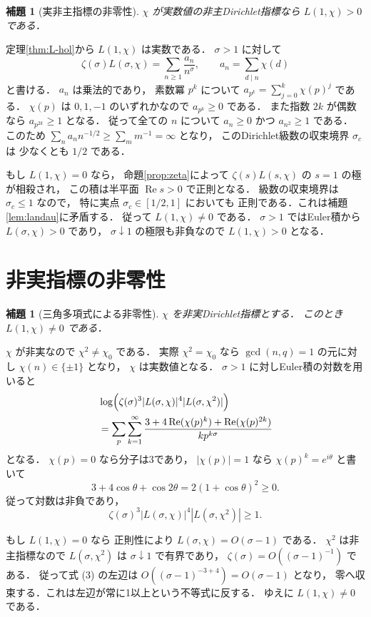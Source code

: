 \documentclass[a5paper,10pt,onecolumn]{jsarticle}
\makeatletter
\theoremstyle{mathnotetheorem}
\newtheorem{lemma}[theorem]{補題}
\renewcommand{\proofname}{証明}
\renewenvironment{proof}[1][\proofname]{%
  \par\pushQED{\qed}\normalfont\topsep4\p@\@plus2\p@\relax
  \trivlist\item[\hskip\labelsep\bfseries #1]\ignorespaces
}{\popQED\endtrivlist\@endpefalse}
\makeatother
\begin{document}
\begin{lemma}[実非主指標の非零性]\label{lem:real-nonzero}
$\chi$ が実数値の非主Dirichlet指標なら
$L(1,\chi)>0$ である．
\end{lemma}
\begin{proof}
定理\ref{thm:L-hol}から $L(1,\chi)$ は実数である．
$\sigma>1$ に対して
\[
 \zeta(\sigma)L(\sigma,\chi)
 =\sum_{n\ge1}\frac{a_n}{n^\sigma},
 \qquad
 a_n=\sum_{d\mid n}\chi(d)
\]
と書ける．
$a_n$ は乗法的であり，
素数冪 $p^k$ について
$a_{p^k}=\sum_{j=0}^k\chi(p)^j$ である．
$\chi(p)$ は $0,1,-1$ のいずれかなので
$a_{p^k}\ge0$ である．
また指数 $2k$ が偶数なら
$a_{p^{2k}}\ge1$ となる．
従って全ての $n$ について $a_n\ge0$ かつ
$a_{n^2}\ge1$ である．
このため
$\sum_n a_nn^{-1/2}\ge\sum_m m^{-1}=\infty$ となり，
このDirichlet級数の収束境界 $\sigma_c$ は
少なくとも $1/2$ である．

もし $L(1,\chi)=0$ なら，
命題\ref{prop:zeta}によって
$\zeta(s)L(s,\chi)$ の $s=1$ の極が相殺され，
この積は半平面 $\operatorname{Re}s>0$ で正則となる．
級数の収束境界は $\sigma_c\le1$ なので，
特に実点 $\sigma_c\in[1/2,1]$ においても
正則である．これは補題\ref{lem:landau}に矛盾する．
従って $L(1,\chi)\ne0$ である．
$\sigma>1$ ではEuler積から
$L(\sigma,\chi)>0$ であり，
$\sigma\downarrow1$ の極限も非負なので
$L(1,\chi)>0$ となる．
\end{proof}

\section{非実指標の非零性}

\begin{lemma}[三角多項式による非零性]\label{lem:complex-nonzero}
$\chi$ を非実Dirichlet指標とする．
このとき $L(1,\chi)\ne0$ である．
\end{lemma}
\begin{proof}
$\chi$ が非実なので $\chi^2\ne\chi_0$ である．
実際 $\chi^2=\chi_0$ なら
$\gcd(n,q)=1$ の元に対し $\chi(n)\in\{\pm1\}$ となり，
$\chi$ は実数値となる．
$\sigma>1$ に対しEuler積の対数を用いると
\[
 \begin{aligned}
 &\log\Bigl(
 \zeta(\sigma)^3|L(\sigma,\chi)|^4
 |L(\sigma,\chi^2)|\Bigr)\\
 &=\sum_p\sum_{k=1}^\infty
 \frac{3+4\operatorname{Re}(\chi(p)^k)
   +\operatorname{Re}(\chi(p)^{2k})}
      {k p^{k\sigma}}
 \end{aligned}
\]
となる．
$\chi(p)=0$ なら分子は3であり，
$|\chi(p)|=1$ なら $\chi(p)^k=e^{i\theta}$ と書いて
\[
 3+4\cos\theta+\cos2\theta
 =2(1+\cos\theta)^2\ge0.
\]
従って対数は非負であり，
\[
 \zeta(\sigma)^3|L(\sigma,\chi)|^4
 |L(\sigma,\chi^2)|\ge1.
 \tag{3}
\]

もし $L(1,\chi)=0$ なら
正則性により $L(\sigma,\chi)=O(\sigma-1)$ である．
$\chi^2$ は非主指標なので
$L(\sigma,\chi^2)$ は $\sigma\downarrow1$ で有界であり，
$\zeta(\sigma)=O((\sigma-1)^{-1})$ である．
従って式 (3) の左辺は
$O((\sigma-1)^{-3+4})=O(\sigma-1)$ となり，
零へ収束する．これは左辺が常に1以上という不等式に反する．
ゆえに $L(1,\chi)\ne0$ である．
\end{proof}
\end{document}
